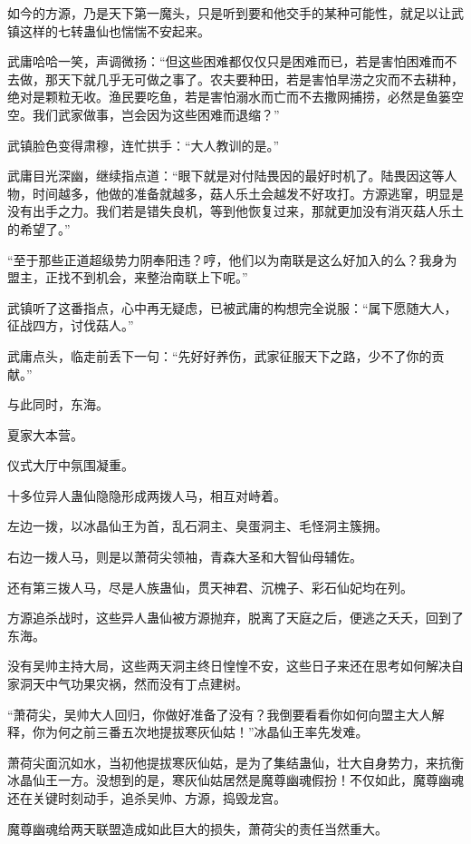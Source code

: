 \begin{this_body}
如今的方源，乃是天下第一魔头，只是听到要和他交手的某种可能性，就足以让武镇这样的七转蛊仙也惴惴不安起来。

武庸哈哈一笑，声调微扬：“但这些困难都仅仅只是困难而已，若是害怕困难而不去做，那天下就几乎无可做之事了。农夫要种田，若是害怕旱涝之灾而不去耕种，绝对是颗粒无收。渔民要吃鱼，若是害怕溺水而亡而不去撒网捕捞，必然是鱼篓空空。我们武家做事，岂会因为这些困难而退缩？”

武镇脸色变得肃穆，连忙拱手：“大人教训的是。”

武庸目光深幽，继续指点道：“眼下就是对付陆畏因的最好时机了。陆畏因这等人物，时间越多，他做的准备就越多，菇人乐土会越发不好攻打。方源逃窜，明显是没有出手之力。我们若是错失良机，等到他恢复过来，那就更加没有消灭菇人乐土的希望了。”

“至于那些正道超级势力阴奉阳违？哼，他们以为南联是这么好加入的么？我身为盟主，正找不到机会，来整治南联上下呢。”

武镇听了这番指点，心中再无疑虑，已被武庸的构想完全说服：“属下愿随大人，征战四方，讨伐菇人。”

武庸点头，临走前丢下一句：“先好好养伤，武家征服天下之路，少不了你的贡献。”

与此同时，东海。

夏家大本营。

仪式大厅中氛围凝重。

十多位异人蛊仙隐隐形成两拨人马，相互对峙着。

左边一拨，以冰晶仙王为首，乱石洞主、臭蛋洞主、毛怪洞主簇拥。

右边一拨人马，则是以萧荷尖领袖，青森大圣和大智仙母辅佐。

还有第三拨人马，尽是人族蛊仙，贯天神君、沉槐子、彩石仙妃均在列。

方源追杀战时，这些异人蛊仙被方源抛弃，脱离了天庭之后，便逃之夭夭，回到了东海。

没有吴帅主持大局，这些两天洞主终日惶惶不安，这些日子来还在思考如何解决自家洞天中气功果灾祸，然而没有丁点建树。

“萧荷尖，吴帅大人回归，你做好准备了没有？我倒要看看你如何向盟主大人解释，你为何之前三番五次地提拔寒灰仙姑！”冰晶仙王率先发难。

萧荷尖面沉如水，当初他提拔寒灰仙姑，是为了集结蛊仙，壮大自身势力，来抗衡冰晶仙王一方。没想到的是，寒灰仙姑居然是魔尊幽魂假扮！不仅如此，魔尊幽魂还在关键时刻动手，追杀吴帅、方源，捣毁龙宫。

魔尊幽魂给两天联盟造成如此巨大的损失，萧荷尖的责任当然重大。


\end{this_body}
